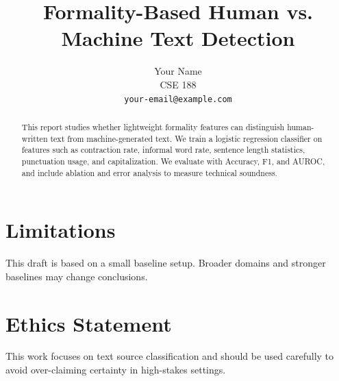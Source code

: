 \documentclass[11pt]{article}
\title{Formality-Based Human vs. Machine Text Detection}
\author{
  Your Name \\
  CSE 188 \\
  \texttt{your-email@example.com}
}
\begin{document}
\maketitle

\begin{abstract}
This report studies whether lightweight formality features can distinguish
human-written text from machine-generated text. We train a logistic regression
classifier on features such as contraction rate, informal word rate, sentence
length statistics, punctuation usage, and capitalization. We evaluate with
Accuracy, F1, and AUROC, and include ablation and error analysis to measure
technical soundness.
\end{abstract}










\section*{Limitations}
This draft is based on a small baseline setup. Broader domains and stronger
baselines may change conclusions.

\section*{Ethics Statement}
This work focuses on text source classification and should be used carefully to
avoid over-claiming certainty in high-stakes settings.



\end{document}
